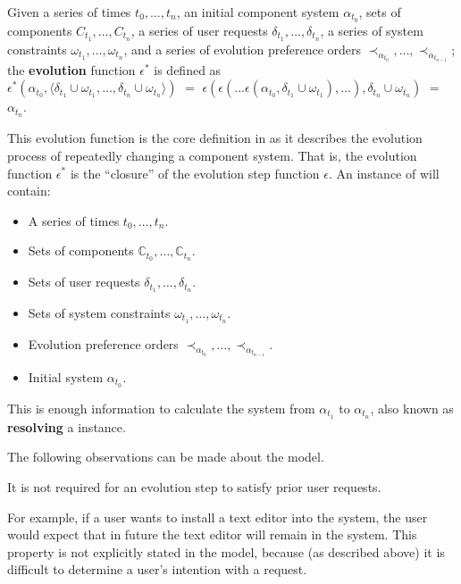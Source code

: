 \begin{defs}
Given a series of times $t_0,\ldots,t_n$, an initial component system $\alpha_{t_0}$, 
sets of components $C_{t_1},\ldots,C_{t_n}$, a series of user requests $\delta_{t_1},\ldots,\delta_{t_n}$, a series of system constraints $\omega_{t_1},\ldots,\omega_{t_n}$,
and a series of evolution preference orders $\prec_{\alpha_{t_0}},\ldots, \prec_{\alpha_{t_{n-1}}}$;
the \textbf{evolution} function $\epsilon^*$ is defined as\\
$\epsilon^*(\alpha_{t_0},\langle \delta_{t_1} \cup \omega_{t_1},\ldots,\delta_{t_n} \cup \omega_{t_n} \rangle)$ $=$ $\epsilon(\epsilon(\ldots \epsilon(\alpha_{t_0},\delta_{t_1} \cup \omega_{t_1}),\ldots),\delta_{t_n} \cup \omega_{t_n})$
$=$ $\alpha_{t_n}$.
\end{defs}

This evolution function is the core definition in \modelname as it describes the evolution process of repeatedly changing a component system.
That is, the evolution function $\epsilon^*$ is the ``closure'' of the evolution step function $\epsilon$.  
An instance of \modelname will contain: 
\begin{itemize}
  \item A series of times $t_0,\ldots,t_n$.
  \item Sets of components $\mathbb{C}_{t_0},\ldots,\mathbb{C}_{t_n}$.
  \item Sets of user requests $\delta_{t_1},\ldots,\delta_{t_n}$.
  \item Sets of system constraints $\omega_{t_1},\ldots,\omega_{t_n}$.
  \item Evolution preference orders $\prec_{\alpha_{t_0}},\ldots, \prec_{\alpha_{t_{n-1}}}$.
  \item Initial system $\alpha_{t_0}$.
\end{itemize}
This is enough information to calculate the system from $\alpha_{t_1}$ to $\alpha_{t_n}$, also known as \textbf{resolving} a \modelname instance.

The following observations can be made about the \modelname model.

\begin{obs}
It is not required for an evolution step to satisfy prior user requests.
\end{obs}
For example, if a user wants to install a text editor into the system, 
the user would expect that in future the text editor will remain in the system.
This property is not explicitly stated in the model, because (as described above) it is difficult to determine a user's intention with a request.

